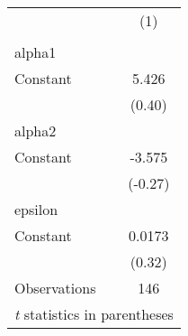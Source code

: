 \begin{tabular}{l*{1}{c}}
\hline\hline
                    &\multicolumn{1}{c}{(1)}\\
                    &\multicolumn{1}{c}{}\\
\hline
alpha1              &            \\
Constant            &       5.426\\
                    &      (0.40)\\
\hline
alpha2              &            \\
Constant            &      -3.575\\
                    &     (-0.27)\\
\hline
epsilon             &            \\
Constant            &      0.0173\\
                    &      (0.32)\\
\hline
Observations        &         146\\
\hline\hline
\multicolumn{2}{l}{\footnotesize \textit{t} statistics in parentheses}\\
\end{tabular}
